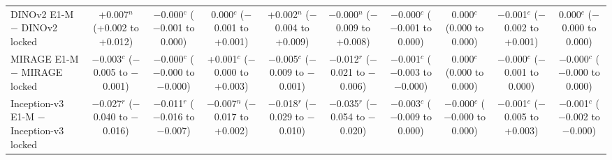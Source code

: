 \begin{tabular}{@{}lccccccccc@{}}
DINOv2 E1-M $-$ DINOv2 locked & \makecell{+0.007$^{n}$\\{\scriptsize (+0.002 to +0.012)}} & \makecell{$-$0.000$^{c}$\\{\scriptsize ($-$0.001 to 0.000)}} & \makecell{0.000$^{c}$\\{\scriptsize ($-$0.001 to +0.001)}} & \makecell{+0.002$^{n}$\\{\scriptsize ($-$0.004 to +0.009)}} & \makecell{$-$0.000$^{n}$\\{\scriptsize ($-$0.009 to +0.008)}} & \makecell{$-$0.000$^{c}$\\{\scriptsize ($-$0.001 to 0.000)}} & \makecell{0.000$^{c}$\\{\scriptsize (0.000 to 0.000)}} & \makecell{$-$0.001$^{c}$\\{\scriptsize ($-$0.002 to +0.001)}} & \makecell{0.000$^{c}$\\{\scriptsize ($-$0.000 to 0.000)}} \\
MIRAGE E1-M $-$ MIRAGE locked & \makecell{$-$0.003$^{c}$\\{\scriptsize ($-$0.005 to $-$0.001)}} & \makecell{$-$0.000$^{c}$\\{\scriptsize ($-$0.000 to $-$0.000)}} & \makecell{+0.001$^{c}$\\{\scriptsize ($-$0.000 to +0.003)}} & \makecell{$-$0.005$^{c}$\\{\scriptsize ($-$0.009 to $-$0.001)}} & \makecell{$-$0.012$^{r}$\\{\scriptsize ($-$0.021 to $-$0.006)}} & \makecell{$-$0.001$^{c}$\\{\scriptsize ($-$0.003 to $-$0.000)}} & \makecell{0.000$^{c}$\\{\scriptsize (0.000 to 0.000)}} & \makecell{$-$0.000$^{c}$\\{\scriptsize ($-$0.001 to 0.000)}} & \makecell{$-$0.000$^{c}$\\{\scriptsize ($-$0.000 to 0.000)}} \\
Inception-v3 E1-M $-$ Inception-v3 locked & \makecell{$-$0.027$^{r}$\\{\scriptsize ($-$0.040 to $-$0.016)}} & \makecell{$-$0.011$^{r}$\\{\scriptsize ($-$0.016 to $-$0.007)}} & \makecell{$-$0.007$^{n}$\\{\scriptsize ($-$0.017 to +0.002)}} & \makecell{$-$0.018$^{r}$\\{\scriptsize ($-$0.029 to $-$0.010)}} & \makecell{$-$0.035$^{r}$\\{\scriptsize ($-$0.054 to $-$0.020)}} & \makecell{$-$0.003$^{c}$\\{\scriptsize ($-$0.009 to 0.000)}} & \makecell{$-$0.000$^{c}$\\{\scriptsize ($-$0.000 to 0.000)}} & \makecell{$-$0.001$^{c}$\\{\scriptsize ($-$0.005 to +0.003)}} & \makecell{$-$0.001$^{c}$\\{\scriptsize ($-$0.002 to $-$0.000)}} \\

\end{tabular}
